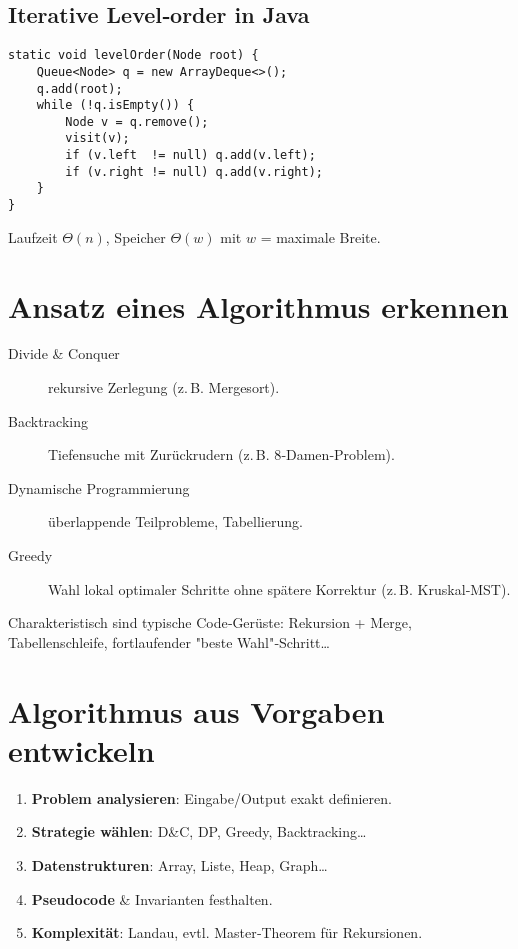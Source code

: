 \subsection*{Iterative Level‑order in Java}
\begin{verbatim}
static void levelOrder(Node root) {
    Queue<Node> q = new ArrayDeque<>();
    q.add(root);
    while (!q.isEmpty()) {
        Node v = q.remove();
        visit(v);
        if (v.left  != null) q.add(v.left);
        if (v.right != null) q.add(v.right);
    }
}
\end{verbatim}
Laufzeit $\Theta(n)$, Speicher $\Theta(w)$ mit $w$ = maximale Breite.

\section{Ansatz eines Algorithmus erkennen}
\begin{description}
  \item[Divide \& Conquer] rekursive Zerlegung (z.\,B. Mergesort).
  \item[Backtracking] Tiefensuche mit Zurückrudern (z.\,B. 8‑Damen‑Problem).
  \item[Dynamische Programmierung] überlappende Teilprobleme, Tabellierung.
  \item[Greedy] Wahl lokal optimaler Schritte ohne spätere Korrektur
        (z.\,B. Kruskal‑MST).
\end{description}
Charakteristisch sind typische Code‑Gerüste: Rekursion + Merge, Tabellenschleife,
fortlaufender "beste Wahl"‑Schritt…

\section{Algorithmus aus Vorgaben entwickeln}
\begin{enumerate}
  \item \textbf{Problem analysieren}: Eingabe/Output exakt definieren.
  \item \textbf{Strategie wählen}: D\&C, DP, Greedy, Backtracking…
  \item \textbf{Datenstrukturen}: Array, Liste, Heap, Graph…
  \item \textbf{Pseudocode} \& Invarianten festhalten.
  \item \textbf{Komplexität}: Landau, evtl. Master‑Theorem für Rekursionen.
\end{enumerate}

